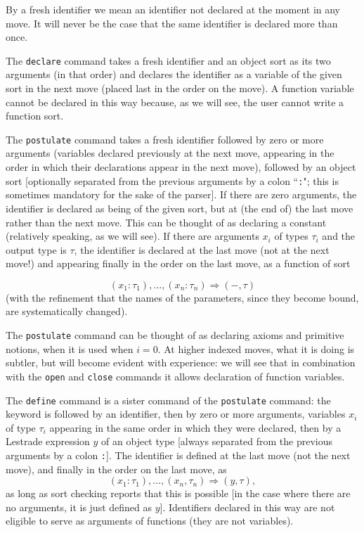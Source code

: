 \documentclass[12pt]{article}
\begin{document}
By a fresh identifier we mean an identifier not declared at the moment in any move.  It will never be the case that the same identifier is declared more than once.

The {\tt declare} command takes a fresh identifier and an object sort as its two arguments (in that order) and declares the identifier as a variable
of the given sort in the next move (placed last in the order on the move).  A function variable cannot be declared in this way because, as we will see, the user cannot write a function sort.

The {\tt postulate} command takes a fresh identifier followed by zero or more arguments (variables declared previously at the next move, appearing in the order in which their declarations appear in the next move), followed
by an object sort  [optionally separated from the previous arguments by a colon ``{\tt :}";  this is sometimes mandatory for the sake of the parser].  If there are zero arguments, the identifier is declared as being of the given sort, but at (the end of) the last move rather than the next move.  This can be thought of as declaring a constant (relatively speaking, as we will see).  If there are arguments $x_i$ of types $\tau_i$
and the output type is $\tau$, the identifier is declared at the last move (not at the next move!) and appearing finally in the order on the last move, as a function of sort

$$(x_1:\tau_1),\ldots,(x_n:\tau_n) \Rightarrow (-,\tau)$$ (with the refinement that the names of the parameters, since they become bound, are systematically changed).

The {\tt postulate} command can be thought of as declaring axioms and primitive notions, when it is used when $i=0$.  At higher indexed moves, what it is doing is subtler, but will become evident with experience:  we will see that in combination with the {\tt open} and {\tt close} commands it allows
declaration of function variables.

The {\tt define} command is a sister command of the {\tt postulate} command:  the keyword is followed by an identifier, then by zero or more arguments, variables $x_i$ of type $\tau_i$ appearing in the same order in which they were declared, then by a Lestrade expression $y$ of an object type [always separated from the previous arguments by a colon {\tt :}].  The identifier is defined at the last move (not the next move), and finally in the order on the last move,  as $$(x_1:\tau_1),\ldots,(x_n,\tau_n) \Rightarrow (y,\tau),$$ as long as sort checking reports that this is possible [in the case where there are no arguments, it is just defined as $y$].   Identifiers declared in this way are not eligible to serve as arguments of functions (they  are not variables).  
\end{document}

